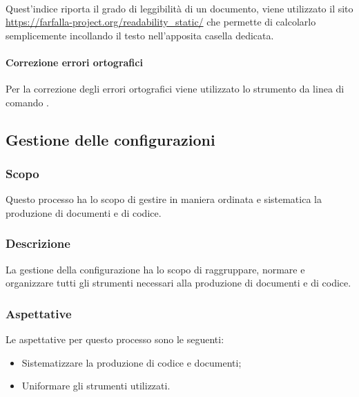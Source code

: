 \paragraph{}
\label{par:gulpease}

Quest'indice riporta il grado di leggibilità di un documento, viene utilizzato il sito 
\url{https://farfalla-project.org/readability_static/} che permette di calcolarlo semplicemente incollando il testo 
nell'apposita casella dedicata.

\paragraph{Correzione errori ortografici}
\label{par:correzione_errori}

Per la correzione degli errori ortografici viene utilizzato lo strumento da linea di comando .

\subsection{Gestione delle configurazioni}
\label{sub:gestione_configurazioni}

\subsubsection{Scopo}
\label{ssub:scopo}

Questo processo ha lo scopo di gestire in maniera ordinata e sistematica la produzione di documenti e di codice.

\subsubsection{Descrizione}
\label{ssub:descrizione}

La gestione della configurazione ha lo scopo di raggruppare, normare e organizzare tutti gli strumenti necessari alla 
produzione di documenti e di codice.

\subsubsection{Aspettative}
\label{ssub:aspettative}

Le aspettative per questo processo sono le seguenti:
\begin{itemize}
    \item Sistematizzare la produzione di codice e documenti;
    \item Uniformare gli strumenti utilizzati.
\end{itemize}


